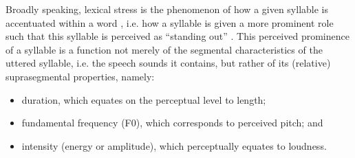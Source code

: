 \documentclass[a4paper]{article}
\begin{document}
Broadly speaking, lexical stress is the phenomenon of how a given syllable is accentuated within a word \cite{Cutler2005}, i.e. how a syllable is given a more prominent role such that this syllable is perceived as ``standing out'' \cite{Dogil1999}. This perceived prominence of a syllable is a function not merely of the segmental characteristics of the uttered syllable, i.e. the speech sounds it contains, but rather of its (relative) suprasegmental properties, namely:
\begin{itemize}[topsep=.5em,noitemsep]
\item duration, which equates on the perceptual level to length;
\item fundamental frequency (F0), which corresponds to perceived pitch; and 
\item intensity (energy or amplitude), which perceptually equates to loudness.
\end{itemize}
\end{document}
